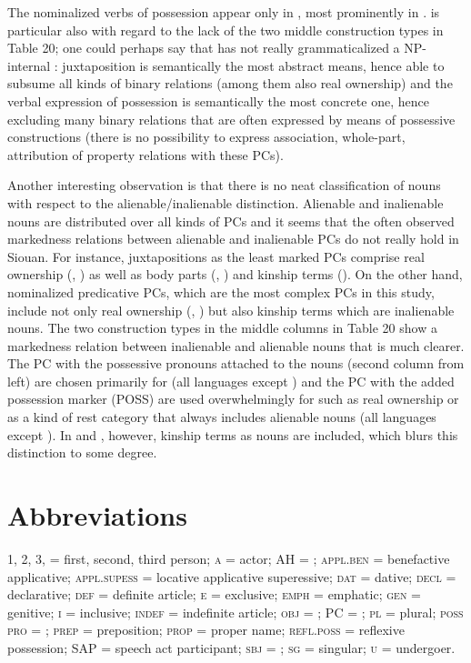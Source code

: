 \documentclass[output=paper]{LSP/langsci}
\begin{document}
The nominalized verbs of possession appear only in , most prominently in .  is particular also with regard to the lack of the two middle construction types in Table 20; one could perhaps say that  has not really grammaticalized a NP-internal :  juxtaposition is semantically the most abstract means, hence able to subsume all kinds of binary relations (among them also real ownership) and the verbal expression of possession is semantically the most concrete one, hence excluding many binary relations that are often expressed by means of possessive constructions (there is no possibility to express association, whole-part, attribution of property relations with these PCs).

Another interesting observation is that there is no neat classification of nouns with respect to the alienable/inalienable distinction. Alienable and inalienable nouns are distributed over all kinds of PCs and it seems that the often observed markedness relations between alienable and inalienable PCs do not really hold in Siouan. For instance, juxtapositions as the least marked PCs comprise real ownership (, ) as well as body parts (, ) and kinship terms (). On the other hand, nominalized predicative PCs, which are the most complex PCs in this study, include not only real ownership (, ) but also kinship terms which are inalienable nouns. The two construction types in the middle columns in Table 20 show a markedness relation between inalienable and alienable nouns that is much clearer. The PC with the possessive pronouns attached to the  nouns (second column from left) are chosen primarily for  (all languages except ) and the PC with the added possession marker (\textsc{POSS}) are used overwhelmingly for  such as real ownership or as a kind of rest category that always includes alienable nouns (all languages except ). In  and , however, kinship terms as  nouns are included, which blurs this distinction to some degree. 
   
\section*{Abbreviations}

1, 2, 3, = first, second, third person; \textsc{a} = actor; AH = ; \textsc{appl.ben} = benefactive applicative; \textsc{appl.supess} = locative applicative superessive; \textsc{dat} = dative; \textsc{decl} = declarative; \textsc{def} = definite article; \textsc{e} = exclusive; \textsc{emph} = emphatic; \textsc{gen} = genitive; \textsc{i} = inclusive; \textsc{indef} = indefinite article; \textsc{obj} = ; PC = ; \textsc{pl} = plural; \textsc{poss pro} = ; \textsc{prep} = preposition; \textsc{prop} = proper name; \textsc{refl.poss} = reflexive possession; SAP = speech act participant; \textsc{sbj} = ; \textsc{sg} = singular; \textsc{u} = undergoer.
 \printbibliography[heading=subbibliography,notkeyword=this]
 
\end{document}
